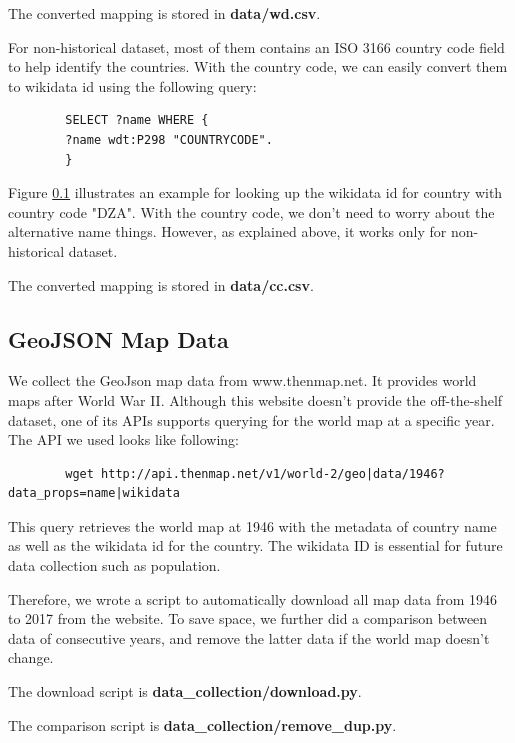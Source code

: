\documentclass[12pt, fullpage,letterpaper]{article}
\begin{document}
        The converted mapping is stored in \textbf{data/wd.csv}.

        For non-historical dataset, most of them contains an ISO 3166 country code field to help identify the countries. With the country code,
        we can easily convert them to wikidata id using the following query:

        \begin{verbatim}
        SELECT ?name WHERE {
        ?name wdt:P298 "COUNTRYCODE".
        }
        \end{verbatim}
        Figure \ref{} illustrates an example for looking up the wikidata id for country with country code "DZA".
        With the country code, we don't need to worry about the alternative name things. However, as explained above,
        it works only for non-historical dataset.
        
        The converted mapping is stored in \textbf{data/cc.csv}.

\subsection{GeoJSON Map Data}
    We collect the GeoJson map data from www.thenmap.net.
    It provides world maps after World War II.
        Although this website doesn't provide the off-the-shelf dataset, one of its
        APIs supports querying for the world map at a specific year. The API
        we used looks like following:

        \begin{verbatim}
        wget http://api.thenmap.net/v1/world-2/geo|data/1946?data_props=name|wikidata
        \end{verbatim}

        This query retrieves the world map at 1946 with the metadata of country name as well as
        the wikidata id for the country. The wikidata ID is essential for future data collection
        such as population.

        Therefore, we wrote a script to automatically download all map data
        from 1946 to 2017 from the website.  To save space, we further did a
        comparison between data of consecutive years, and remove the latter
        data if the world map doesn't change.

        The download script is \textbf{data\_collection/download.py}.
        
        The comparison script is \textbf{data\_collection/remove\_dup.py}.
\end{document}
